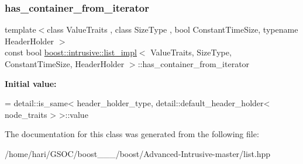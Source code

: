 \subsubsection{\texorpdfstring{has\+\_\+container\+\_\+from\+\_\+iterator}{has\_container\_from\_iterator}}
{\footnotesize\ttfamily template$<$class Value\+Traits , class Size\+Type , bool Constant\+Time\+Size, typename Header\+Holder $>$ \\
const bool \hyperlink{classboost_1_1intrusive_1_1list__impl}{boost\+::intrusive\+::list\+\_\+impl}$<$ Value\+Traits, Size\+Type, Constant\+Time\+Size, Header\+Holder $>$\+::has\+\_\+container\+\_\+from\+\_\+iterator\hspace{0.3cm}{\ttfamily [static]}}

{\bfseries Initial value\+:}
\begin{DoxyCode}
=
        detail::is\_same< header\_holder\_type, detail::default\_header\_holder< node\_traits > >::value
\end{DoxyCode}


The documentation for this class was generated from the following file\+:\begin{DoxyCompactItemize}
\item 
/home/hari/\+G\+S\+O\+C/boost\+\_\+\_\+\_/boost/\+Advanced-\/\+Intrusive-\/master/list.\+hpp\end{DoxyCompactItemize}
